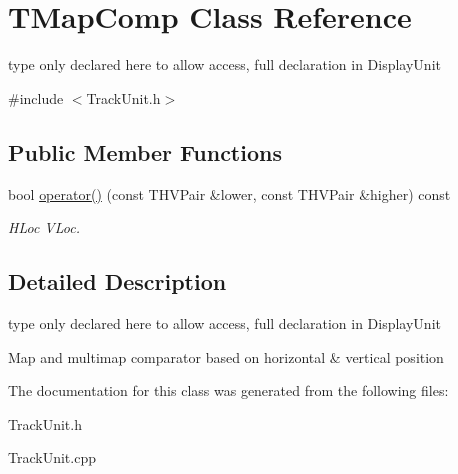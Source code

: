 \hypertarget{class_t_map_comp}{}\section{T\+Map\+Comp Class Reference}
\label{class_t_map_comp}


type only declared here to allow access, full declaration in Display\+Unit  




{\ttfamily \#include $<$Track\+Unit.\+h$>$}

\subsection*{Public Member Functions}
\begin{DoxyCompactItemize}
\item 
\mbox{\label{class_t_map_comp_a6784886eff8452405709d93063d74147}} 
bool \mbox{\hyperlink{class_t_map_comp_a6784886eff8452405709d93063d74147}{operator()}} (const T\+H\+V\+Pair \&lower, const T\+H\+V\+Pair \&higher) const
\begin{DoxyCompactList}\small\item\em H\+Loc V\+Loc. \end{DoxyCompactList}\end{DoxyCompactItemize}


\subsection{Detailed Description}
type only declared here to allow access, full declaration in Display\+Unit 

Map and multimap comparator based on horizontal \& vertical position 

The documentation for this class was generated from the following files\+:\begin{DoxyCompactItemize}
\item 
Track\+Unit.\+h\item 
Track\+Unit.\+cpp\end{DoxyCompactItemize}
